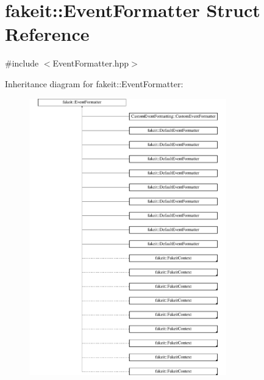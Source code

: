 \hypertarget{structfakeit_1_1EventFormatter}{}\section{fakeit\+::Event\+Formatter Struct Reference}
\label{structfakeit_1_1EventFormatter}


{\ttfamily \#include $<$Event\+Formatter.\+hpp$>$}

Inheritance diagram for fakeit\+::Event\+Formatter\+:\begin{figure}[H]
\begin{center}
\leavevmode
\includegraphics[height=12.000000cm]{structfakeit_1_1EventFormatter}
\end{center}
\end{figure}
